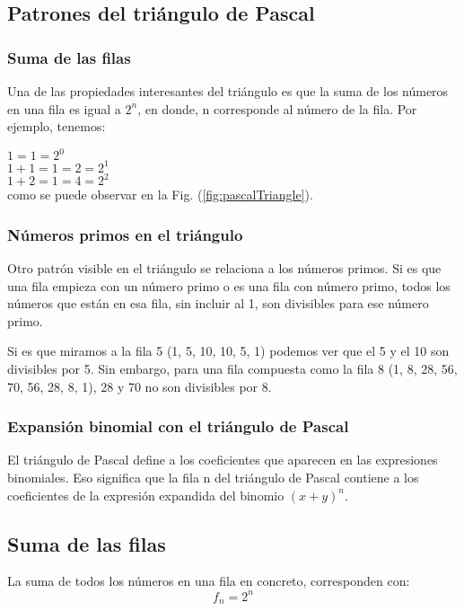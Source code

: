 \subsection{Patrones del triángulo de Pascal}

\subsubsection{Suma de las filas}

Una de las propiedades interesantes del triángulo es que la suma de los números
en una fila es igual a $2^n$, en donde, n corresponde al número de la fila. Por
ejemplo, tenemos:

$ 1 = 1 = 2^0 $ \\
$ 1 + 1 = 1 = 2 = 2^1 $ \\
$ 1 + 2 = 1 = 4 = 2^2 $\\

como se puede observar en la Fig. (\ref{fig:pascalTriangle}).

\subsubsection{Números primos en el triángulo}

Otro patrón visible en el triángulo se relaciona a los números primos. Si es que
una fila empieza con un número primo o es una fila con número primo, todos los
números que están en esa fila, sin incluir al 1, son divisibles para ese número
primo.

Si es que miramos a la fila 5 (1, 5, 10, 10, 5, 1) podemos ver que el 5 y el 10
son divisibles por 5. Sin embargo, para una fila compuesta como la fila 8 (1, 8,
28, 56, 70, 56, 28, 8, 1), 28 y 70 no son divisibles por 8.


\subsubsection{Expansión binomial con el triángulo de Pascal}

El triángulo de Pascal define a los coeficientes que aparecen en las expresiones
binomiales. Eso significa que la fila n del triángulo de Pascal contiene a los
coeficientes de la expresión expandida del binomio $(x+y)^n$.


\subsection{Suma de las filas}
La suma de todos los n\'umeros en una fila en concreto, corresponden con:
		\begin{equation}
			f_n = 2^n
		\end{equation}

